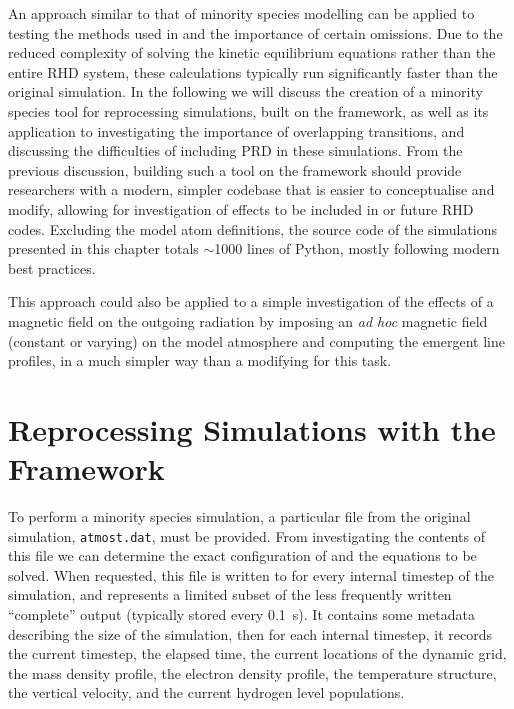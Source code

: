 An approach similar to that of minority species modelling can be applied to testing the methods used in \Radyn{} and the importance of certain omissions.
Due to the reduced complexity of solving the kinetic equilibrium equations rather than the entire RHD system, these calculations typically run significantly faster than the original simulation.
In the following we will discuss the creation of a minority species tool for reprocessing \Radyn{} simulations, built on the \Lw{} framework, as well as its application to investigating the importance of overlapping transitions, and discussing the difficulties of including PRD in these simulations.
From the previous discussion, building such a tool on the \Lw{} framework should provide researchers with a modern, simpler codebase that is easier to conceptualise and modify, allowing for investigation of effects to be included in \Radyn{} or future RHD codes.
Excluding the model atom definitions, the source code of the simulations presented in this chapter totals $\sim$1000 lines of Python, mostly following modern best practices.

This approach could also be applied to a simple investigation of the effects of a magnetic field on the outgoing radiation by imposing an \emph{ad hoc} magnetic field (constant or varying) on the model atmosphere and computing the emergent line profiles, in a much simpler way than a modifying \Radyn{} for this task.

\section{Reprocessing \Radyn{} Simulations with the \Lw{} Framework}

To perform a minority species simulation, a particular file from the original simulation, \texttt{atmost.dat}, must be provided.
From investigating the contents of this file we can determine the exact configuration of \Lw{} and the equations to be solved.
When requested, this file is written to for every internal timestep of the \Radyn{} simulation, and represents a limited subset of the less frequently written ``complete'' output (typically stored every \SI{0.1}{\second}).
It contains some metadata describing the size of the simulation, then for each internal timestep, it records the current timestep, the elapsed time, the current locations of the dynamic grid, the mass density profile, the electron density profile, the temperature structure, the vertical velocity, and the current hydrogen level populations.

